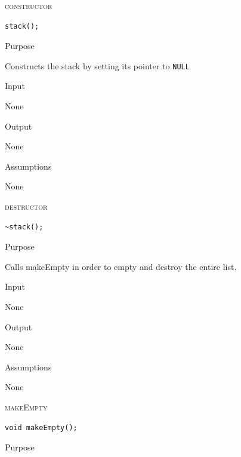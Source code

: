 \documentclass[pdftex, 11pt]{article}
\begin{document}
\begin{description}

	\item{\textsc{constructor}}

		\begin{lstlisting}
stack();
		\end{lstlisting}

		\begin{description}
			\item{Purpose}
				
				Constructs the stack by setting its pointer
				to \texttt{NULL}

			\item{Input}

				None

			\item{Output}
				
				None

			\item{Assumptions}

				None

		\end{description}


	\item{\textsc{destructor}}

		\begin{lstlisting}
~stack();
		\end{lstlisting}

		\begin{description}
			\item{Purpose}
				
				Calls makeEmpty in order to empty and destroy
				the entire list.

			\item{Input}

				None

			\item{Output}
				
				None

			\item{Assumptions}

				None

		\end{description}
	\item{\textsc{makeEmpty}}

		\begin{lstlisting}
void makeEmpty();
		\end{lstlisting}

		\begin{description}
			\item{Purpose}
				

\end{description}
\end{description}
\end{document}
